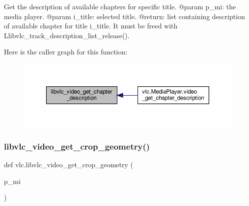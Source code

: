\begin{DoxyVerb}Get the description of available chapters for specific title.
@param p_mi: the media player.
@param i_title: selected title.
@return: list containing description of available chapter for title i_title. It must be freed with L{libvlc_track_description_list_release}().
\end{DoxyVerb}
 Here is the caller graph for this function\+:
\nopagebreak
\begin{figure}[H]
\begin{center}
\leavevmode
\includegraphics[width=350pt]{namespacevlc_a5104946a600f435d5bc0493607457ea5_icgraph}
\end{center}
\end{figure}
\mbox{\label{namespacevlc_a90ce254d86107126899a45083478af1c}} 
\subsubsection{\texorpdfstring{libvlc\+\_\+video\+\_\+get\+\_\+crop\+\_\+geometry()}{libvlc\_video\_get\_crop\_geometry()}}
{\footnotesize\ttfamily def vlc.\+libvlc\+\_\+video\+\_\+get\+\_\+crop\+\_\+geometry (\begin{DoxyParamCaption}\item[{}]{p\+\_\+mi }\end{DoxyParamCaption})}

